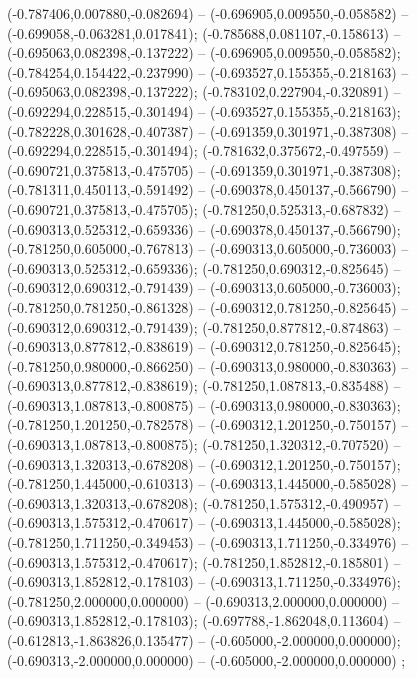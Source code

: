  (-0.787406,0.007880,-0.082694) -- (-0.696905,0.009550,-0.058582) -- (-0.699058,-0.063281,0.017841);
 (-0.785688,0.081107,-0.158613) -- (-0.695063,0.082398,-0.137222) -- (-0.696905,0.009550,-0.058582);
 (-0.784254,0.154422,-0.237990) -- (-0.693527,0.155355,-0.218163) -- (-0.695063,0.082398,-0.137222);
 (-0.783102,0.227904,-0.320891) -- (-0.692294,0.228515,-0.301494) -- (-0.693527,0.155355,-0.218163);
 (-0.782228,0.301628,-0.407387) -- (-0.691359,0.301971,-0.387308) -- (-0.692294,0.228515,-0.301494);
 (-0.781632,0.375672,-0.497559) -- (-0.690721,0.375813,-0.475705) -- (-0.691359,0.301971,-0.387308);
 (-0.781311,0.450113,-0.591492) -- (-0.690378,0.450137,-0.566790) -- (-0.690721,0.375813,-0.475705);
 (-0.781250,0.525313,-0.687832) -- (-0.690313,0.525312,-0.659336) -- (-0.690378,0.450137,-0.566790);
 (-0.781250,0.605000,-0.767813) -- (-0.690313,0.605000,-0.736003) -- (-0.690313,0.525312,-0.659336);
 (-0.781250,0.690312,-0.825645) -- (-0.690312,0.690312,-0.791439) -- (-0.690313,0.605000,-0.736003);
 (-0.781250,0.781250,-0.861328) -- (-0.690312,0.781250,-0.825645) -- (-0.690312,0.690312,-0.791439);
 (-0.781250,0.877812,-0.874863) -- (-0.690313,0.877812,-0.838619) -- (-0.690312,0.781250,-0.825645);
 (-0.781250,0.980000,-0.866250) -- (-0.690313,0.980000,-0.830363) -- (-0.690313,0.877812,-0.838619);
 (-0.781250,1.087813,-0.835488) -- (-0.690313,1.087813,-0.800875) -- (-0.690313,0.980000,-0.830363);
 (-0.781250,1.201250,-0.782578) -- (-0.690312,1.201250,-0.750157) -- (-0.690313,1.087813,-0.800875);
 (-0.781250,1.320312,-0.707520) -- (-0.690313,1.320313,-0.678208) -- (-0.690312,1.201250,-0.750157);
 (-0.781250,1.445000,-0.610313) -- (-0.690313,1.445000,-0.585028) -- (-0.690313,1.320313,-0.678208);
 (-0.781250,1.575312,-0.490957) -- (-0.690313,1.575312,-0.470617) -- (-0.690313,1.445000,-0.585028);
 (-0.781250,1.711250,-0.349453) -- (-0.690313,1.711250,-0.334976) -- (-0.690313,1.575312,-0.470617);
 (-0.781250,1.852812,-0.185801) -- (-0.690313,1.852812,-0.178103) -- (-0.690313,1.711250,-0.334976);
 (-0.781250,2.000000,0.000000) -- (-0.690313,2.000000,0.000000) -- (-0.690313,1.852812,-0.178103);
 (-0.697788,-1.862048,0.113604) -- (-0.612813,-1.863826,0.135477) -- (-0.605000,-2.000000,0.000000);
 (-0.690313,-2.000000,0.000000) -- (-0.605000,-2.000000,0.000000) ;
